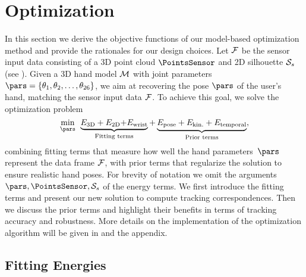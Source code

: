 



\section{Optimization}
\label{sec:optimization}
In this section we derive the objective functions of our model-based optimization method
and provide the rationales for our design choices. 
Let $\mathcal{F}$ be the sensor input data consisting of a 3D point cloud $\PointsSensor$ and 2D silhouette $\mathcal{S}_{s}$ (see ). Given a 3D hand model $\mathcal{M}$ with joint parameters $\pars = \{ \theta_1, \theta_2,\hdots, \theta_{26} \}$, we aim at recovering the pose $\pars$ of the user's hand, matching the sensor input data $\mathcal{F}$. 
To achieve this goal, we solve the optimization 
problem
% 
%
\begin{equation}
\label{eq:tracking_optimization}
\min_{\pars} \:\: \underbrace{E_{\text{3D}} + E_{\text{2D}} \new{+ E_{\text{wrist}}}}_{\text{Fitting terms}} + \underbrace{E_{\text{pose}} + E_{\text{kin.}} + E_{\text{temporal}}}_{\text{Prior terms}},
\end{equation}
%
combining fitting terms that measure how well the hand parameters~$\pars$ represent the data frame $\mathcal{F}$, with prior terms that regularize the solution to ensure realistic hand poses. For brevity of notation we omit the arguments $\pars, \PointsSensor,\SilhoSensor$ of the energy terms. We first introduce the fitting terms and present our new solution to compute tracking correspondences. Then we discuss the prior terms and highlight their benefits in terms of tracking accuracy and robustness. 
%
More details on the  implementation of the optimization algorithm will be given in  and the appendix.



\subsection{Fitting Energies}
\label{sec:fitting}


%

